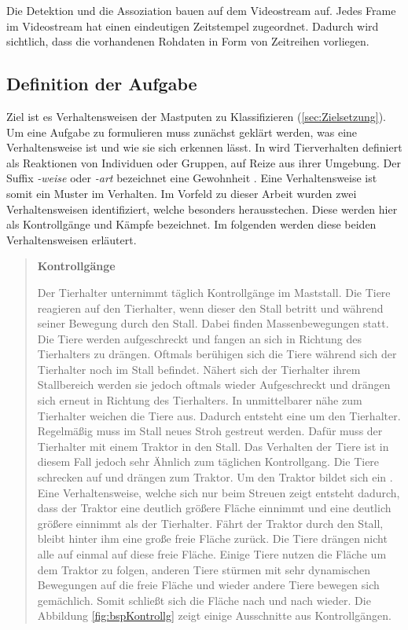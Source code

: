 Die \gls{Detektion} und die \gls{Assoziation} bauen auf dem Videostream auf. Jedes \gls{Frame} im Videostream hat einen eindeutigen Zeitstempel zugeordnet. Dadurch wird sichtlich, dass die vorhandenen Rohdaten in Form von Zeitreihen vorliegen.

\subsection{Definition der Aufgabe} \label{sec:Meth DefAufgabe}
Ziel ist es Verhaltensweisen der Mastputen zu Klassifizieren (\ref{sec:Zielsetzung}). Um eine Aufgabe zu formulieren muss zunächst geklärt werden, was eine Verhaltensweise ist und wie sie sich erkennen lässt. In \cite{Levitis.2009} wird Tierverhalten definiert als Reaktionen von Individuen oder Gruppen, auf Reize aus ihrer Umgebung. Der Suffix \textit{-weise} oder \textit{-art} bezeichnet eine Gewohnheit \cite{duden.art}. Eine Verhaltensweise ist somit ein Muster im Verhalten. Im Vorfeld zu dieser Arbeit wurden zwei Verhaltensweisen identifiziert, welche besonders herausstechen. Diese werden hier als Kontrollgänge und Kämpfe bezeichnet. Im folgenden werden diese beiden Verhaltensweisen erläutert. \dubpar

\begin{quote}

\textbf{Kontrollgänge}\par
Der Tierhalter unternimmt täglich Kontrollgänge im Maststall. Die Tiere reagieren auf den Tierhalter, wenn dieser den Stall betritt und während seiner Bewegung durch den Stall. Dabei finden Massenbewegungen statt. Die Tiere werden aufgeschreckt und fangen an sich in Richtung des Tierhalters zu drängen. Oftmals berühigen sich die Tiere während sich der Tierhalter noch im Stall befindet. Nähert sich der Tierhalter ihrem Stallbereich werden sie jedoch oftmals wieder Aufgeschreckt und drängen sich erneut in Richtung des Tierhalters. In unmittelbarer nähe zum Tierhalter weichen die Tiere aus. Dadurch entsteht eine  um den Tierhalter. Regelmäßig muss im Stall neues Stroh gestreut werden. Dafür muss der Tierhalter mit einem Traktor in den Stall. Das Verhalten der Tiere ist in diesem Fall jedoch sehr Ähnlich zum täglichen Kontrollgang. Die Tiere schrecken auf und drängen zum Traktor. Um den Traktor bildet sich ein . Eine Verhaltensweise, welche sich nur beim Streuen zeigt entsteht dadurch, dass der Traktor eine deutlich größere Fläche einnimmt und eine deutlich größere   einnimmt als der Tierhalter. Fährt der Traktor durch den Stall, bleibt hinter ihm eine große freie Fläche zurück. Die Tiere drängen nicht alle auf einmal auf diese freie Fläche. Einige Tiere nutzen die Fläche um dem Traktor zu folgen, anderen Tiere stürmen mit sehr dynamischen Bewegungen auf die freie Fläche und wieder andere Tiere bewegen sich gemächlich. Somit schließt sich die Fläche nach und nach wieder. Die Abbildung \ref{fig:bspKontrollg} zeigt einige Ausschnitte aus Kontrollgängen. 
\end{quote}

